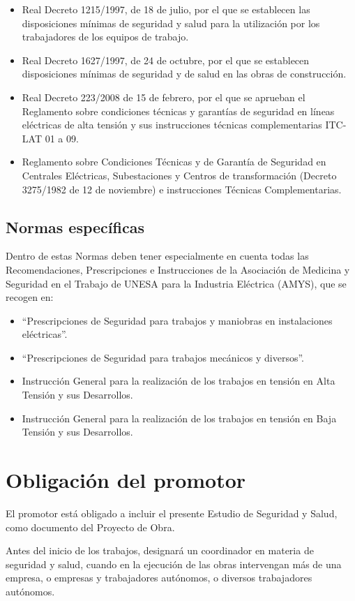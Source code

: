 \begin{itemize}
    \item Real Decreto 1215/1997, de 18 de julio, por el que se establecen las disposiciones mínimas de seguridad y salud para la utilización por los trabajadores de los equipos de trabajo.
    \item Real Decreto 1627/1997, de 24 de octubre, por el que se establecen disposiciones mínimas de seguridad y de salud en las obras de construcción.
    \item Real Decreto 223/2008 de 15 de febrero, por el que se aprueban el Reglamento sobre condiciones técnicas y garantías de seguridad en líneas eléctricas de alta tensión y sus instrucciones técnicas complementarias ITC-LAT 01 a 09.
    \item Reglamento sobre Condiciones Técnicas y de Garantía de Seguridad en Centrales Eléctricas, Subestaciones y Centros de transformación (Decreto 3275/1982 de 12 de noviembre) e instrucciones Técnicas Complementarias.
\end{itemize}
\subsection{Normas específicas}
\label{subsec:sys-normasEspecificas}
Dentro de estas Normas deben tener especialmente en cuenta todas las Recomendaciones, Prescripciones e Instrucciones de la Asociación de Medicina y Seguridad en el Trabajo de UNESA para la Industria Eléctrica (AMYS), que se recogen en:
\begin{itemize}
\item “Prescripciones de Seguridad para trabajos y maniobras en instalaciones eléctricas”.
\item “Prescripciones de Seguridad para trabajos mecánicos y diversos”.
\item Instrucción General para la realización de los trabajos en tensión en Alta Tensión y sus Desarrollos.
\item Instrucción General para la realización de los trabajos en tensión en Baja Tensión y sus Desarrollos.
\end{itemize}
\section{Obligación del promotor}
\label{sec:sys-promotor}
El promotor está obligado a incluir el presente Estudio de Seguridad y Salud, como documento del Proyecto de Obra.

Antes del inicio de los trabajos, designará un coordinador en materia de seguridad y salud, cuando en la ejecución de las obras intervengan más de una empresa, o empresas y trabajadores autónomos, o diversos trabajadores autónomos.

